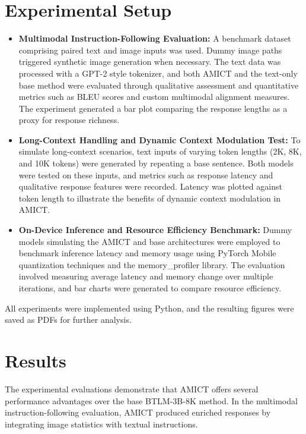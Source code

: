\documentclass{article} %
\begin{document}
\section{Experimental Setup}
\label{sec:experimental}
\begin{itemize}
  \item \textbf{Multimodal Instruction-Following Evaluation:} A benchmark dataset comprising paired text and image inputs was used. Dummy image paths triggered synthetic image generation when necessary. The text data was processed with a GPT-2 style tokenizer\citep{Ma2020}, and both AMICT and the text-only base method were evaluated through qualitative assessment and quantitative metrics such as BLEU scores and custom multimodal alignment measures. The experiment generated a bar plot comparing the response lengths as a proxy for response richness.
  
  \item \textbf{Long-Context Handling and Dynamic Context Modulation Test:} To simulate long-context scenarios, text inputs of varying token lengths (2K, 8K, and 10K tokens) were generated by repeating a base sentence. Both models were tested on these inputs, and metrics such as response latency and qualitative response features were recorded. Latency was plotted against token length to illustrate the benefits of dynamic context modulation in AMICT.
  
  \item \textbf{On-Device Inference and Resource Efficiency Benchmark:} Dummy models simulating the AMICT and base architectures were employed to benchmark inference latency and memory usage using PyTorch Mobile\citep{Efron2004} quantization techniques and the memory\_profiler library\citep{DelSer2019}. The evaluation involved measuring average latency and memory change over multiple iterations, and bar charts were generated to compare resource efficiency.
\end{itemize}

All experiments were implemented using Python, and the resulting figures were saved as PDFs for further analysis.

\section{Results}
\label{sec:results}
The experimental evaluations demonstrate that AMICT offers several performance advantages over the base BTLM-3B-8K method. In the multimodal instruction-following evaluation, AMICT produced enriched responses by integrating image statistics with textual instructions.
\end{document}

